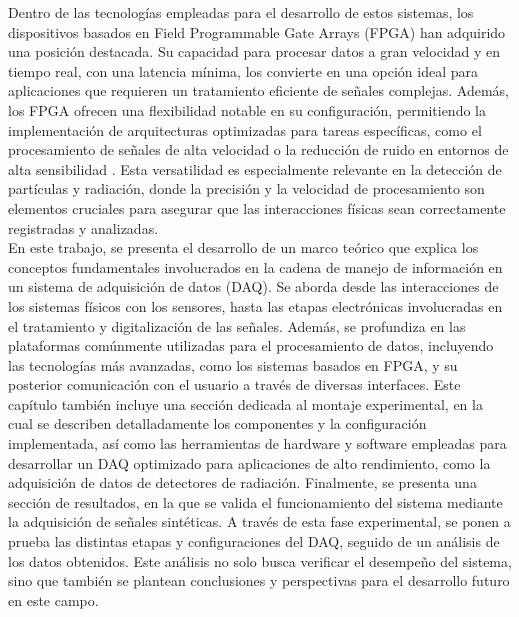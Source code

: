 \documentclass{report}
\begin{document}
\noindent Dentro de las tecnologías empleadas para el desarrollo de estos sistemas, los dispositivos basados en Field Programmable Gate Arrays (FPGA) han adquirido una posición destacada. Su capacidad para procesar datos a gran velocidad y en tiempo real, con una latencia mínima, los convierte en una opción ideal para aplicaciones que requieren un tratamiento eficiente de señales complejas. Además, los FPGA ofrecen una flexibilidad notable en su configuración, permitiendo la implementación de arquitecturas optimizadas para tareas específicas, como el procesamiento de señales de alta velocidad o la reducción de ruido en entornos de alta sensibilidad \cite{meyer2007digital}. Esta versatilidad es especialmente relevante en la detección de partículas y radiación, donde la precisión y la velocidad de procesamiento son elementos cruciales para asegurar que las interacciones físicas sean correctamente registradas y analizadas.\\

\noindent En este trabajo, se presenta el desarrollo de un marco teórico que explica los conceptos fundamentales involucrados en la cadena de manejo de información en un sistema de adquisición de datos (DAQ). Se aborda desde las interacciones de los sistemas físicos con los sensores, hasta las etapas electrónicas involucradas en el tratamiento y digitalización de las señales. Además, se profundiza en las plataformas comúnmente utilizadas para el procesamiento de datos, incluyendo las tecnologías más avanzadas, como los sistemas basados en FPGA, y su posterior comunicación con el usuario a través de diversas interfaces. Este capítulo también incluye una sección dedicada al montaje experimental, en la cual se describen detalladamente los componentes y la configuración implementada, así como las herramientas de hardware y software empleadas para desarrollar un DAQ optimizado para aplicaciones de alto rendimiento, como la adquisición de datos de detectores de radiación. Finalmente, se presenta una sección de resultados, en la que se valida el funcionamiento del sistema mediante la adquisición de señales sintéticas. A través de esta fase experimental, se ponen a prueba las distintas etapas y configuraciones del DAQ, seguido de un análisis de los datos obtenidos. Este análisis no solo busca verificar el desempeño del sistema, sino que también se plantean conclusiones y perspectivas para el desarrollo futuro en este campo.

\newpage
\end{document}
